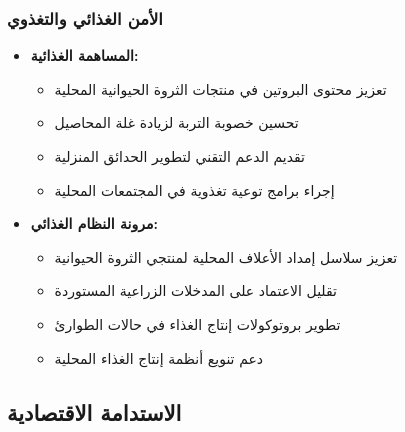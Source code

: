 \subsubsection{الأمن الغذائي والتغذوي}
\begin{itemize}
    \item \textbf{المساهمة الغذائية:}
    \begin{itemize}
        \item تعزيز محتوى البروتين في منتجات الثروة الحيوانية المحلية
        \item تحسين خصوبة التربة لزيادة غلة المحاصيل
        \item تقديم الدعم التقني لتطوير الحدائق المنزلية
        \item إجراء برامج توعية تغذوية في المجتمعات المحلية
    \end{itemize}
    
    \item \textbf{مرونة النظام الغذائي:}
    \begin{itemize}
        \item تعزيز سلاسل إمداد الأعلاف المحلية لمنتجي الثروة الحيوانية
        \item تقليل الاعتماد على المدخلات الزراعية المستوردة
        \item تطوير بروتوكولات إنتاج الغذاء في حالات الطوارئ
        \item دعم تنويع أنظمة إنتاج الغذاء المحلية
    \end{itemize}
\end{itemize}

\subsection{الاستدامة الاقتصادية}

